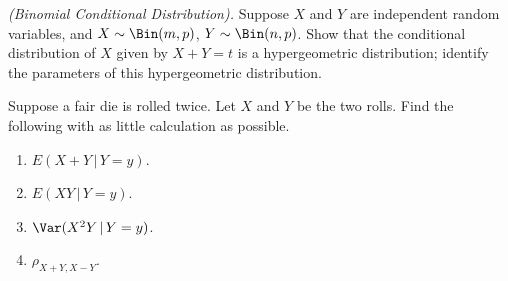 \begin{problem}[Handout 15, \# 14]
  \emph{(Binomial Conditional Distribution).} Suppose \(X\) and \(Y\) are
  independent random variables, and \(X\sim\Bin(m,p)\),
  \(Y\sim\Bin(n,p)\). Show that the conditional distribution of \(X\) given
  by \(X+Y=t\) is a hypergeometric distribution; identify the parameters of
  this hypergeometric distribution.
\end{problem}
\begin{solution}

\end{solution}
\newpage

\begin{problem}[Handout 15, \# 15]
  Suppose a fair die is rolled twice. Let \(X\) and \(Y\) be the two
  rolls. Find the following with as little calculation as possible.
  \begin{enumerate}[label=(\alph*),noitemsep]
  \item \(E(X+Y\,|\,Y=y)\).
  \item \(E(XY\,|\,Y=y)\).
  \item \(\Var(X^2Y\,|\,Y=y)\).
  \item \(\rho_{X+Y,X-Y}\).
  \end{enumerate}
\end{problem}
\begin{solution}

\end{solution}
\newpage

